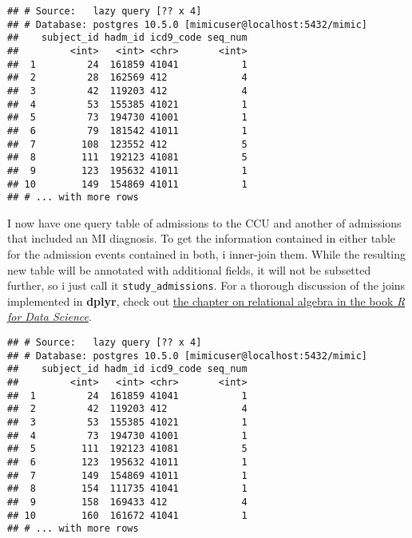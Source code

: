 \documentclass[]{article}
\newenvironment{Shaded}{\begin{snugshade}}{\end{snugshade}}
\newcommand{\KeywordTok}[1]{\textcolor[rgb]{0.13,0.29,0.53}{\textbf{#1}}}
\newcommand{\DataTypeTok}[1]{\textcolor[rgb]{0.13,0.29,0.53}{#1}}
\newcommand{\StringTok}[1]{\textcolor[rgb]{0.31,0.60,0.02}{#1}}
\newcommand{\OperatorTok}[1]{\textcolor[rgb]{0.81,0.36,0.00}{\textbf{#1}}}
\newcommand{\NormalTok}[1]{#1}
\begin{document}
\begin{verbatim}
## # Source:   lazy query [?? x 4]
## # Database: postgres 10.5.0 [mimicuser@localhost:5432/mimic]
##    subject_id hadm_id icd9_code seq_num
##         <int>   <int> <chr>       <int>
##  1         24  161859 41041           1
##  2         28  162569 412             4
##  3         42  119203 412             4
##  4         53  155385 41021           1
##  5         73  194730 41001           1
##  6         79  181542 41011           1
##  7        108  123552 412             5
##  8        111  192123 41081           5
##  9        123  195632 41011           1
## 10        149  154869 41011           1
## # ... with more rows
\end{verbatim}

I now have one query table of admissions to the CCU and another of
admissions that included an MI diagnosis. To get the information
contained in either table for the admission events contained in both, i
inner-join them. While the resulting new table will be annotated with
additional fields, it will not be subsetted further, so i just call it
\texttt{study\_admissions}. For a thorough discussion of the joins
implemented in \textbf{dplyr}, check out
\href{https://r4ds.had.co.nz/relational-data.html}{the chapter on
relational algebra in the book \emph{R for Data Science}}.

\begin{Shaded}
\end{Shaded}

\begin{verbatim}
## # Source:   lazy query [?? x 4]
## # Database: postgres 10.5.0 [mimicuser@localhost:5432/mimic]
##    subject_id hadm_id icd9_code seq_num
##         <int>   <int> <chr>       <int>
##  1         24  161859 41041           1
##  2         42  119203 412             4
##  3         53  155385 41021           1
##  4         73  194730 41001           1
##  5        111  192123 41081           5
##  6        123  195632 41011           1
##  7        149  154869 41011           1
##  8        154  111735 41041           1
##  9        158  169433 412             4
## 10        160  161672 41041           1
## # ... with more rows
\end{verbatim}
\end{document}
